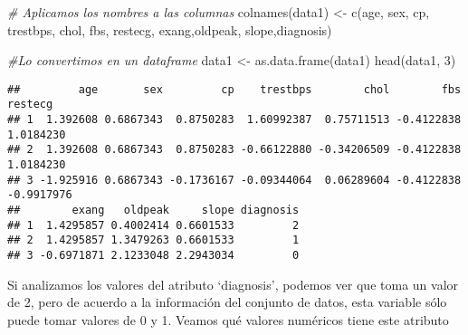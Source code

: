 \documentclass[
]{article}
\newenvironment{Shaded}{\begin{snugshade}}{\end{snugshade}}
\newcommand{\CommentTok}[1]{\textcolor[rgb]{0.56,0.35,0.01}{\textit{#1}}}
\newcommand{\DecValTok}[1]{\textcolor[rgb]{0.00,0.00,0.81}{#1}}
\newcommand{\FunctionTok}[1]{\textcolor[rgb]{0.00,0.00,0.00}{#1}}
\newcommand{\NormalTok}[1]{#1}
\newcommand{\OtherTok}[1]{\textcolor[rgb]{0.56,0.35,0.01}{#1}}
\newcommand{\SpecialCharTok}[1]{\textcolor[rgb]{0.00,0.00,0.00}{#1}}
\newcommand{\StringTok}[1]{\textcolor[rgb]{0.31,0.60,0.02}{#1}}
\begin{document}
\begin{Shaded}
\begin{Highlighting}[]
\CommentTok{\# Aplicamos los nombres a las columnas}
\FunctionTok{colnames}\NormalTok{(data1) }\OtherTok{\textless{}{-}} \FunctionTok{c}\NormalTok{(}\StringTok{\textquotesingle{}age\textquotesingle{}}\NormalTok{, }\StringTok{\textquotesingle{}sex\textquotesingle{}}\NormalTok{, }\StringTok{\textquotesingle{}cp\textquotesingle{}}\NormalTok{, }\StringTok{\textquotesingle{}trestbps\textquotesingle{}}\NormalTok{, }\StringTok{\textquotesingle{}chol\textquotesingle{}}\NormalTok{, }\StringTok{\textquotesingle{}fbs\textquotesingle{}}\NormalTok{,}
                    \StringTok{\textquotesingle{}restecg\textquotesingle{}}\NormalTok{, }\StringTok{\textquotesingle{}exang\textquotesingle{}}\NormalTok{,}\StringTok{\textquotesingle{}oldpeak\textquotesingle{}}\NormalTok{, }\StringTok{\textquotesingle{}slope\textquotesingle{}}\NormalTok{,}\StringTok{\textquotesingle{}diagnosis\textquotesingle{}}\NormalTok{)}

\CommentTok{\#Lo convertimos en un dataframe}
\NormalTok{data1 }\OtherTok{\textless{}{-}} \FunctionTok{as.data.frame}\NormalTok{(data1)}
\FunctionTok{head}\NormalTok{(data1, }\DecValTok{3}\NormalTok{)}
\end{Highlighting}
\end{Shaded}

\begin{verbatim}
##         age       sex         cp    trestbps        chol        fbs    restecg
## 1  1.392608 0.6867343  0.8750283  1.60992387  0.75711513 -0.4122838  1.0184230
## 2  1.392608 0.6867343  0.8750283 -0.66122880 -0.34206509 -0.4122838  1.0184230
## 3 -1.925916 0.6867343 -0.1736167 -0.09344064  0.06289604 -0.4122838 -0.9917976
##        exang   oldpeak     slope diagnosis
## 1  1.4295857 0.4002414 0.6601533         2
## 2  1.4295857 1.3479263 0.6601533         1
## 3 -0.6971871 2.1233048 2.2943034         0
\end{verbatim}

Si analizamos los valores del atributo `diagnosis', podemos ver que toma
un valor de 2, pero de acuerdo a la información del conjunto de datos,
esta variable sólo puede tomar valores de 0 y 1. Veamos qué valores
numéricos tiene este atributo

\begin{Shaded}
\end{Shaded}
\end{document}
